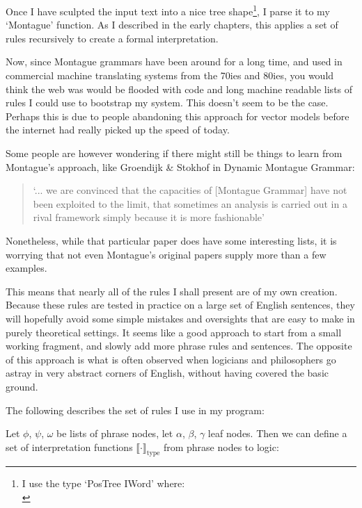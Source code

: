 \documentclass[12pt]{article}
\begin{document}
Once I have sculpted the input text into a nice tree shape\footnote{I use the type `PosTree IWord' where:\\
\usebox{\LstBox}}, I parse it to my `Montague' function. As I described in the early chapters, this applies a set of rules recursively to create a formal interpretation.

Now, since Montague grammars have been around for a long time, and used in commercial machine translating systems from the 70ies and 80ies, you would think the web was would be flooded with code and long machine readable lists of rules I could use to bootstrap my system. This doesn't seem to be the case. Perhaps this is due to people abandoning this approach for vector models before the internet had really picked up the speed of today.

Some people are however wondering if there might still be things to learn from Montague's approach, like Groendijk \& Stokhof in Dynamic Montague Grammar\cite{groenendijk1990dynamic}:
\begin{quotation}
`... we are convinced that the capacities of [Montague Grammar] have not been exploited to the limit, that sometimes an analysis is carried out in a rival framework simply because it is more fashionable'
\end{quotation}

Nonetheless, while that particular paper does have some interesting lists, it is worrying that not even Montague's original papers supply more than a few examples.

This means that nearly all of the rules I shall present are of my own creation. Because these rules are tested in practice on a large set of English sentences, they will hopefully avoid some simple mistakes and oversights that are easy to make in purely theoretical settings. It seems like a good approach to start from a small working fragment, and slowly add more phrase rules and sentences. The opposite of this approach is what is often observed when logicians and philosophers go astray in very abstract corners of English, without having covered the basic ground.

The following describes the set of rules I use in my program:

Let $\phi$, $\psi$, $\omega$ be lists of phrase nodes, let $\alpha$, $\beta$, $\gamma$ leaf nodes.
Then we can define a set of interpretation functions $\llbracket\cdot\rrbracket_\text{type}$ from phrase nodes to logic:
\end{document}

